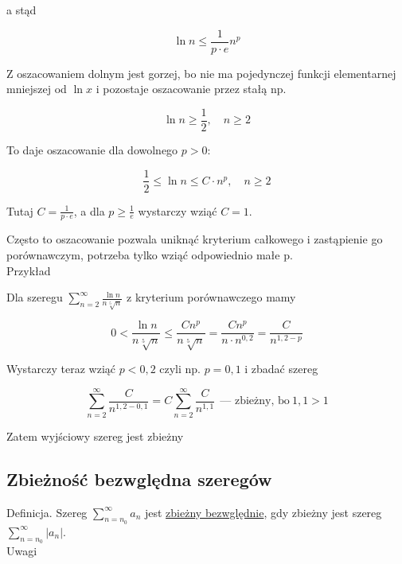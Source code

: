 a stąd

$$ \ln n \leq \frac{1}{p \cdot e} n^p $$

Z oszacowaniem dolnym jest gorzej, bo nie ma pojedynczej funkcji elementarnej mniejszej od $\ln x$ i pozostaje oszacowanie
przez stałą np.

$$ \ln n \geq \frac{1}{2}, \quad n \geq 2  $$

To daje oszacowanie dla dowolnego $p>0$:

$$ \frac{1}{2} \leq \ln n \leq C \cdot n^p, \quad n \geq 2 $$

Tutaj $ C = \frac{1}{p \cdot e} $, a dla $ p \geq \frac{1}{e} $ wystarczy wziąć $C = 1$.

Często to oszacowanie pozwala uniknąć kryterium całkowego i zastąpienie go porównawczym, potrzeba tylko wziąć
odpowiednio małe p. \\

Przykład

Dla szeregu $ \sum\limits_{n = 2}^{\infty} \frac{\ln n}{n \sqrt[5]{n}} $ z kryterium porównawczego mamy

$$ 0 < \frac{\ln n}{n \sqrt[5]{n}} \leq \frac{Cn^p}{n \sqrt[5]{n}} = \frac{Cn^p}{n \cdot n^{0,2}} = \frac{C}{n^{1,2 - p}} $$

Wystarczy teraz wziąć $p < 0,2$ czyli np. $p = 0,1$ i zbadać szereg

$$ \sum\limits_{n=2}^{\infty} \frac{C}{n^{1,2 - 0,1}} = C \sum\limits_{n=2}^{\infty} \frac{C}{n^{1,1}} 
\ \ \textrm{--- zbieżny, bo} \ 1,1 > 1$$

Zatem wyjściowy szereg jest zbieżny


\subsection*{Zbieżność bezwględna szeregów}

Definicja. Szereg $ \sum\limits_{n=n_0}^{\infty} a_n$ jest \underline{zbieżny bezwględnie}, gdy zbieżny jest szereg
$ \sum\limits_{n=n_0}^{\infty} |a_n|$. \\

Uwagi

